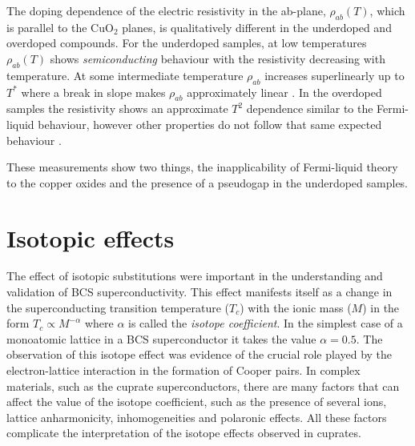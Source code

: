 The doping dependence of the electric resistivity in the ab-plane, $\rho_{ab}(T)$, which is parallel to the CuO$_2$ planes, is qualitatively different in the underdoped and overdoped compounds.
For the underdoped samples, at low temperatures $\rho_{ab}(T)$ shows \textit{semiconducting} behaviour with the resistivity decreasing with temperature.
At some intermediate temperature $\rho_{ab}$ increases superlinearly up to $T^*$ where a break in slope makes $\rho_{ab}$ approximately linear \cite{Timusk1999}.
In the overdoped samples the resistivity shows an approximate $T^2$ dependence \cite{Damascelli2003} similar to the Fermi-liquid behaviour, however other properties do not follow that same expected behaviour \cite{Orenstein2000}.

These measurements show two things, the inapplicability of Fermi-liquid theory to the copper oxides and the presence of a pseudogap in the underdoped samples.

\section{Isotopic effects}
\label{sec:isotopic_effects}

The effect of isotopic substitutions were important in the understanding and validation of BCS superconductivity.
This effect manifests itself as a change in the superconducting transition temperature ($T_c$) with the ionic mass ($M$) in the form $T_c \propto M^{-\alpha}$ where $\alpha$ is called the \textit{isotope coefficient}.
In the simplest case of a monoatomic lattice in a BCS superconductor it takes the value $\alpha=0.5$.
The observation of this isotope effect \cite{Reynolds1950,Maxwell1950} was evidence of the crucial role played by the electron-lattice interaction in the formation of Cooper pairs. 
In complex materials, such as the cuprate superconductors, there are many factors that can affect the value of the isotope coefficient, such as the presence of several ions, lattice anharmonicity, inhomogeneities and polaronic effects.
All these factors complicate the interpretation of the isotope effects observed in cuprates.


